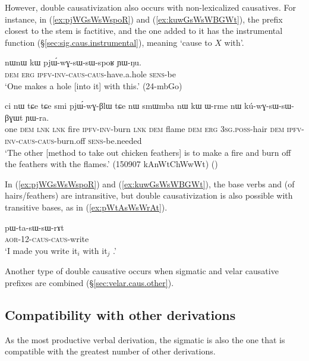 However, double causativization also occurs with non-lexicalized causatives. For instance, in (\ref{ex:pjWGsWsWspoR}) and (\ref{ex:kuwGsWsWBGWt}), the  prefix closest to the stem is factitive, and the one added to it has the instrumental function (§\ref{sec:sig.caus.instrumental}), meaning  `cause to $X$ with'. 

\begin{exe}
\ex \label{ex:pjWGsWsWspoR}
\gll nɯnɯ kɯ pjɯ́-wɣ-sɯ-sɯ-spoʁ ɲɯ-ŋu. \\
\textsc{dem} \textsc{erg} \textsc{ipfv}-\textsc{inv}-\textsc{caus}-\textsc{caus}-have.a.hole \textsc{sens}-be \\
\glt `One makes a hole [into it] with this.' (24-mbGo)
 \end{exe} 
 
\begin{exe}
\ex \label{ex:kuwGsWsWBGWt}
\gll ci nɯ tɕe tɕe smi pjɯ́-wɣ-βlɯ tɕe nɯ smɯmba nɯ kɯ ɯ-rme nɯ kú-wɣ-sɯ-sɯ-βɣɯt ɲɯ-ra. \\
one \textsc{dem} \textsc{lnk} \textsc{lnk} fire \textsc{ipfv}-\textsc{inv}-burn \textsc{lnk} \textsc{dem} flame \textsc{dem} \textsc{erg} \textsc{3sg}.\textsc{poss}-hair \textsc{dem} \textsc{ipfv}-\textsc{inv}-\textsc{caus}-\textsc{caus}-burn.off \textsc{sens}-be.needed \\
\glt `The other [method to take out chicken feathers] is to make a fire and burn off the feathers with the flames.' (150907 kAnWtChWwWt)
()
 \end{exe} 
 
 In (\ref{ex:pjWGsWsWspoR}) and (\ref{ex:kuwGsWsWBGWt}), the base verbs  and  (of hairs/feathers) are intransitive, but double causativization is also possible with transitive bases, as in (\ref{ex:pWtAsWsWrAt}).
 
 \begin{exe}
\ex \label{ex:pWtAsWsWrAt}
\gll  pɯ-ta-sɯ-sɯ-rɤt \\
\textsc{aor}-1\fl{}2-\textsc{caus}-\textsc{caus}-write \\
\glt `I made you write it$_i$ with it$_j$ .' 
  \end{exe} 

Another type of double causative occurs when sigmatic and velar causative prefixes are combined (§\ref{sec:velar.caus.other}).

\subsection{Compatibility with other derivations} \label{sec:sig.caus.other.derivations}
As the most productive verbal derivation, the sigmatic is also the one that is compatible with the greatest number of other derivations.

